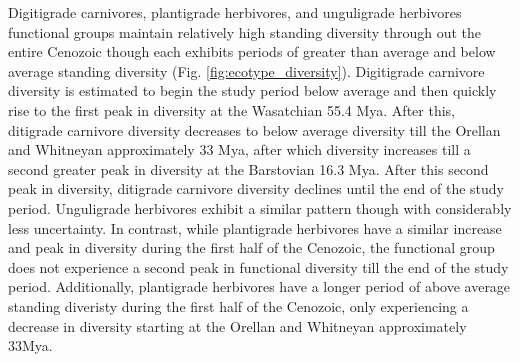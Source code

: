 \documentclass[12pt,letterpaper]{article}
\begin{document}
Digitigrade carnivores, plantigrade herbivores, and unguligrade herbivores functional groups maintain relatively high standing diversity through out the entire Cenozoic though each exhibits periods of greater than average and below average standing diversity (Fig. \ref{fig:ecotype_diversity}). Digitigrade carnivore diversity is estimated to begin the study period below average and then quickly rise to the first peak in diversity at the Wasatchian 55.4 Mya. After this, ditigrade carnivore diversity decreases to below average diversity till the Orellan and Whitneyan approximately 33 Mya, after which diversity increases till a second greater peak in diversity at the Barstovian 16.3 Mya. After this second peak in diversity, ditigrade carnivore diversity declines until the end of the study period. Unguligrade herbivores exhibit a similar pattern though with considerably less uncertainty. In contrast, while plantigrade herbivores have a similar increase and peak in diversity during the first half of the Cenozoic, the functional group does not experience a second peak in functional diversity till the end of the study period. Additionally, plantigrade herbivores have a longer period of above average standing diveristy during the first half of the Cenozoic, only experiencing a decrease in diversity starting at the Orellan and Whitneyan approximately 33Mya.
\end{document}
